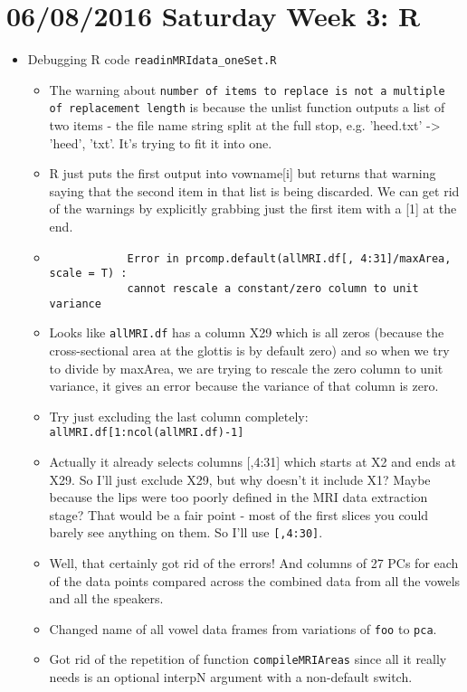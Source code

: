 \documentclass{article}
\begin{document}
\section*{06/08/2016 Saturday Week 3: R}
\begin{itemize}
    \item Debugging R code \verb|readinMRIdata_oneSet.R|
    \begin{itemize}
        \item The warning about \verb|number of items to replace is not a multiple of replacement length| is because the unlist function outputs a list of two items - the file name string split at the full stop, e.g. 'heed.txt' -> 'heed', 'txt'. It's trying to fit it into one.
        \item R just puts the first output into vowname[i] but returns that warning saying that the second item in that list is being discarded. We can get rid of the warnings by explicitly grabbing just the first item with a [1] at the end.
        \item \begin{verbatim}
            Error in prcomp.default(allMRI.df[, 4:31]/maxArea, scale = T) : 
            cannot rescale a constant/zero column to unit variance
        \end{verbatim}
        \item Looks like \verb|allMRI.df| has a column X29 which is all zeros (because the cross-sectional area at the glottis is by default zero) and so when we try to divide by maxArea, we are trying to rescale the zero column to unit variance, it gives an error because the variance of that column is zero.
        \item Try just excluding the last column completely: \verb|allMRI.df[1:ncol(allMRI.df)-1]|
        \item Actually it already selects columns [,4:31] which starts at X2 and ends at X29. So I'll just exclude X29, but why doesn't it include X1? Maybe because the lips were too poorly defined in the MRI data extraction stage? That would be a fair point - most of the first slices you could barely see anything on them. So I'll use \verb|[,4:30]|.
        \item Well, that certainly got rid of the errors! And columns of 27 PCs for each of the data points compared across the combined data from all the vowels and all the speakers.
        \item Changed name of all vowel data frames from variations of \verb|foo| to \verb|pca|.
        \item Got rid of the repetition of function \verb|compileMRIAreas| since all it really needs is an optional interpN argument with a non-default switch.

\end{itemize}
\end{itemize}
\end{document}

